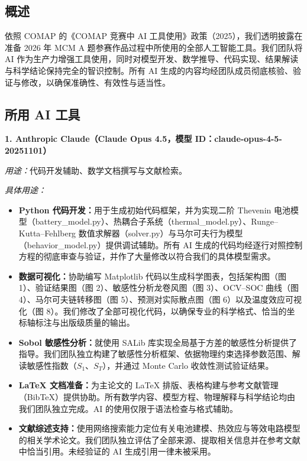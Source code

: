 \documentclass[11pt,a4paper]{ctexart}
\begin{document}
\subsection*{概述}

依照 COMAP 的《COMAP 竞赛中 AI 工具使用》政策（2025），我们透明披露在准备 2026 年 MCM A 题参赛作品过程中所使用的全部人工智能工具。我们团队将 AI 作为生产力增强工具使用，同时对模型开发、数学推导、代码实现、结果解读与科学结论保持完全的智识控制。所有 AI 生成的内容均经团队成员彻底核验、验证与修改，以确保准确性、有效性与适当性。

\subsection*{所用 AI 工具}

\textbf{1. Anthropic Claude（Claude Opus 4.5，模型 ID：claude-opus-4-5-20251101）}

\emph{用途：}代码开发辅助、数学文档撰写与文献检索。

\emph{具体用途：}
\begin{itemize}[leftmargin=1.8em,itemsep=0.25em]
\item \textbf{Python 代码开发：}用于生成初始代码框架，并为实现二阶 Thevenin 电池模型（battery\_model.py）、热耦合子系统（thermal\_model.py）、Runge--Kutta--Fehlberg 数值求解器（solver.py）与马尔可夫行为模型（behavior\_model.py）提供调试辅助。所有 AI 生成的代码均经逐行对照控制方程的彻底审查与验证，并作了大量修改以符合我们的具体模型需求。
\item \textbf{数据可视化：}协助编写 Matplotlib 代码以生成科学图表，包括架构图（图 1）、验证结果图（图 2）、敏感性分析龙卷风图（图 3）、OCV--SOC 曲线（图 4）、马尔可夫链转移图（图 5）、预测对实际散点图（图 6）以及温度效应可视化（图 8）。我们修改了全部可视化代码，以确保专业的科学格式、恰当的坐标轴标注与出版级质量的输出。
\item \textbf{Sobol 敏感性分析：}就使用 SALib 库实现全局基于方差的敏感性分析提供了指导。我们团队独立构建了敏感性分析框架、依据物理约束选择参数范围、解读敏感性指数（$S_1$、$S_T$），并通过 Monte Carlo 收敛性测试验证结果。
\item \textbf{LaTeX 文档准备：}为主论文的 LaTeX 排版、表格构建与参考文献管理（BibTeX）提供协助。所有数学内容、模型方程、物理解释与科学结论均由我们团队独立完成。AI 的使用仅限于语法检查与格式辅助。
\item \textbf{文献综述支持：}使用网络搜索能力定位有关电池建模、热效应与等效电路模型的相关学术论文。我们团队独立评估了全部来源、提取相关信息并在参考文献中恰当引用。未经验证的 AI 生成引用一律未被采用。
\end{itemize}
\end{document}
